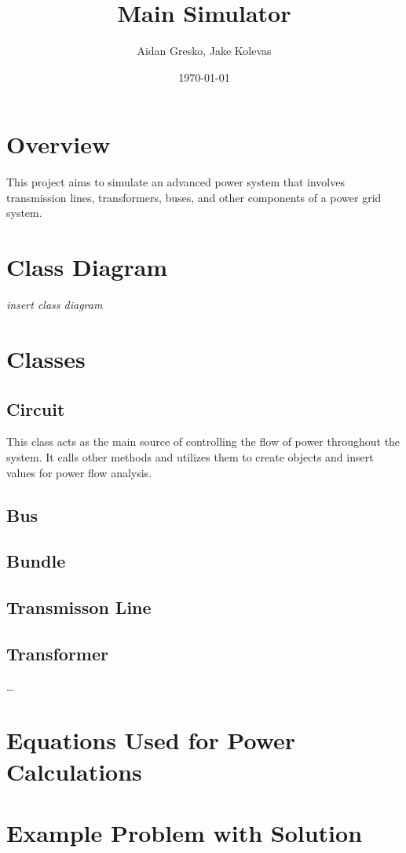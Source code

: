 \documentclass{article}
\author{Aidan Gresko, Jake Kolevas}
\title{Main Simulator}
\date{\today}
\begin{document}
	\maketitle
	
	\section{Overview}
	This project aims to simulate an advanced power system that involves transmission lines, transformers, buses, and other components of a power grid system.
	
	\section{Class Diagram}
	
	\textit{insert class diagram}
	
	\section{Classes}
	
	\subsection{Circuit}
	This class acts as the main source of controlling the flow of power throughout the system. It calls other methods and utilizes them to create objects and insert values for power flow analysis.
	
	\subsection{Bus}
	
	\subsection{Bundle}
	
	\subsection{Transmisson Line}
	
	\subsection{Transformer}
	
	\dots
	
	\section{Equations Used for Power Calculations}
	
	\section{Example Problem with Solution}
	
	
\end{document}
